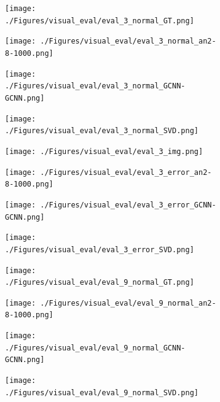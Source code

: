 \documentclass[border=15pt, multi, tikz]{article}
\begin{document}
\begin{figure}[H]
	\begin{subfigure}[b]{0.24\linewidth}
	\texttt{[image: ./Figures/visual\_eval/eval\_3\_normal\_GT.png]}
\end{subfigure}
\begin{subfigure}[b]{0.24\linewidth}
	\texttt{[image: ./Figures/visual\_eval/eval\_3\_normal\_an2-8-1000.png]}
\end{subfigure}
\begin{subfigure}[b]{0.24\linewidth}
	\texttt{[image: ./Figures/visual\_eval/eval\_3\_normal\_GCNN-GCNN.png]}
\end{subfigure}
\begin{subfigure}[b]{0.24\linewidth}
	\texttt{[image: ./Figures/visual\_eval/eval\_3\_normal\_SVD.png]}
\end{subfigure}

\begin{subfigure}[b]{0.24\linewidth}
	\texttt{[image: ./Figures/visual\_eval/eval\_3\_img.png]}
\end{subfigure}
\begin{subfigure}[b]{0.24\linewidth}
	\texttt{[image: ./Figures/visual\_eval/eval\_3\_error\_an2-8-1000.png]}
\end{subfigure}
\begin{subfigure}[b]{0.24\linewidth}
	\texttt{[image: ./Figures/visual\_eval/eval\_3\_error\_GCNN-GCNN.png]}
\end{subfigure}
\begin{subfigure}[b]{0.24\linewidth}
	\texttt{[image: ./Figures/visual\_eval/eval\_3\_error\_SVD.png]}
\end{subfigure}



	\begin{subfigure}[b]{0.24\linewidth}
	\texttt{[image: ./Figures/visual\_eval/eval\_9\_normal\_GT.png]}
\end{subfigure}
\begin{subfigure}[b]{0.24\linewidth}
	\texttt{[image: ./Figures/visual\_eval/eval\_9\_normal\_an2-8-1000.png]}
\end{subfigure}
\begin{subfigure}[b]{0.24\linewidth}
	\texttt{[image: ./Figures/visual\_eval/eval\_9\_normal\_GCNN-GCNN.png]}
\end{subfigure}
\begin{subfigure}[b]{0.24\linewidth}
	\texttt{[image: ./Figures/visual\_eval/eval\_9\_normal\_SVD.png]}
\end{subfigure}


\end{figure}
\end{document}
